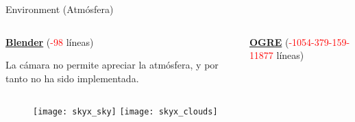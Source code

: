 \begin{frame}{Environment (Atmósfera)}
\begin{columns}
  \begin{column}{0.5\textwidth}
    \textbf{\underline{Blender}} (\textcolor{red}{-98} líneas)
    
    \vspace{0.4cm}
    La cámara no permite apreciar la atmósfera, y por tanto no ha sido implementada.
  \end{column}

  \begin{column}{0.5\textwidth}
    \textbf{\underline{OGRE}} (\textcolor{red}{-1054-379-159-11877} líneas)
    
    \vspace{0.4cm}
  \end{column}
\end{columns}
\begin{figure}
	\texttt{[image: skyx\_sky]} 
	\texttt{[image: skyx\_clouds]} 
\end{figure}
\end{frame}

